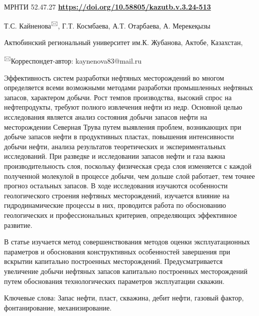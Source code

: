 \newpage
МРНТИ 52.47.27
\hfill {\bfseries \href{https://doi.org/10.58805/kazutb.v.3.24-513}{https://doi.org/10.58805/kazutb.v.3.24-513}}


\begin{center}
Т.С. Кайненова\textsuperscript{🖂}, Г.Т. Космбаева, А.Т. Отарбаева, А.
Мерекеқызы

Актюбинский региональный университет им.К. Жубанова, Актобе, Казахстан,

\textsuperscript{🖂}Корреспондет-автор: kaynenova83@mail.ru
\end{center}

Эффективность систем разработки нефтяных месторождений во многом
определяется всеми возможными методами разработки промышленных нефтяных
запасов, характером добычи. Рост темпов производства, высокий спрос на
нефтепродукты, требуют полного извлечения нефти из недр. Основной целью
исследования является анализ состояния добычи запасов нефти на
месторождении Северная Трува путем выявления проблем, возникающих при
добыче запасов нефти в продуктивных пластах, повышения интенсивности
добычи нефти, анализа результатов теоретических и экспериментальных
исследований. При разведке и исследовании запасов нефти и газа важна
производительность слоя, поскольку физическая среда слоя изменяется с
каждой полученной молекулой в процессе добычи, чем дольше слой работает,
тем точнее прогноз остальных запасов. В ходе исследования изучаются
особенности геологического строения нефтяных месторождений, изучается
влияние на гидродинамические процессы в них, проводится работа по
обоснованию геологических и профессиональных критериев, определяющих
эффективное развитие.

В статье изучается метод совершенствования методов оценки
эксплуатационных параметров и обоснования конструктивных особенностей
завершения при вскрытии капитально построенных месторождений.
Предусматривается увеличение добычи нефтяных запасов капитально
построенных месторождений путем обоснования технологических параметров
эксплуатации скважин.

Ключевые слова: Запас нефти, пласт, скважина, дебит нефти, газовый
фактор, фонтанирование, механизирование.


